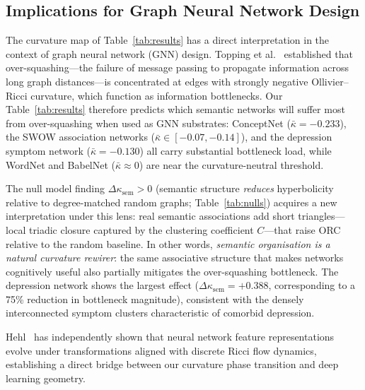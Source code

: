 \documentclass[11pt,a4paper]{article}
\newcommand{\kbar}{\bar{\kappa}}
\newcommand{\Dksem}{\Delta\kappa_{\text{sem}}}
\begin{document}
\subsection{Implications for Graph Neural Network Design}
\label{sec:gnn}

The curvature map of Table~\ref{tab:results} has a direct interpretation in the context of graph neural network (GNN) design. Topping et al.~\cite{topping2022over} established that over-squashing---the failure of message passing to propagate information across long graph distances---is concentrated at edges with strongly negative Ollivier--Ricci curvature, which function as information bottlenecks. Our Table~\ref{tab:results} therefore predicts which semantic networks will suffer most from over-squashing when used as GNN substrates: ConceptNet ($\kbar = -0.233$), the SWOW association networks ($\kbar \in [-0.07, -0.14]$), and the depression symptom network ($\kbar = -0.130$) all carry substantial bottleneck load, while WordNet and BabelNet ($\kbar \approx 0$) are near the curvature-neutral threshold.

The null model finding $\Dksem > 0$ (semantic structure \emph{reduces} hyperbolicity relative to degree-matched random graphs; Table~\ref{tab:nulls}) acquires a new interpretation under this lens: real semantic associations add short triangles---local triadic closure captured by the clustering coefficient $C$---that raise ORC relative to the random baseline. In other words, \emph{semantic organisation is a natural curvature rewirer}: the same associative structure that makes networks cognitively useful also partially mitigates the over-squashing bottleneck. The depression network shows the largest effect ($\Dksem = +0.388$, corresponding to a 75\% reduction in bottleneck magnitude), consistent with the densely interconnected symptom clusters characteristic of comorbid depression.

Hehl~\cite{hehl2025neural} has independently shown that neural network feature representations evolve under transformations aligned with discrete Ricci flow dynamics, establishing a direct bridge between our curvature phase transition and deep learning geometry.
\end{document}
